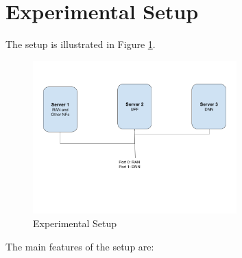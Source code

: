 \section {Experimental Setup}
The setup is illustrated in Figure \ref{fig:ExperimentalSetup}.
\begin{figure}[htbp]
    \centering
    \includegraphics[width=0.7\textwidth, keepaspectratio]{./fig/Results/Setup.png}
    \caption{Experimental Setup}
    \label{fig:ExperimentalSetup}
\end{figure}
 The main features of the setup are: 
